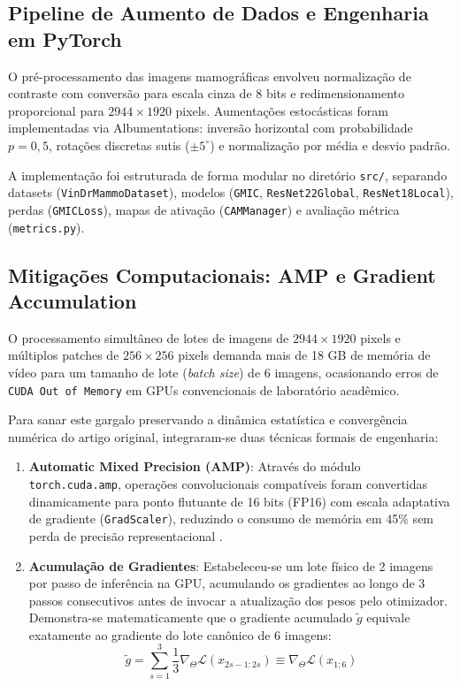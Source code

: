 \documentclass[12pt]{article}
\begin{document}
\subsection{Pipeline de Aumento de Dados e Engenharia em PyTorch}

O pré-processamento das imagens mamográficas envolveu normalização de contraste com conversão para escala cinza de 8 bits e redimensionamento proporcional para $2944 \times 1920$ pixels. Aumentações estocásticas foram implementadas via Albumentations: inversão horizontal com probabilidade $p=0,5$, rotações discretas sutis ($\pm 5^\circ$) e normalização por média e desvio padrão.

A implementação foi estruturada de forma modular no diretório \texttt{src/}, separando datasets (\texttt{VinDrMammoDataset}), modelos (\texttt{GMIC}, \texttt{ResNet22Global}, \texttt{ResNet18Local}), perdas (\texttt{GMICLoss}), mapas de ativação (\texttt{CAMManager}) e avaliação métrica (\texttt{metrics.py}).

\subsection{Mitigações Computacionais: AMP e Gradient Accumulation}

O processamento simultâneo de lotes de imagens de $2944 \times 1920$ pixels e múltiplos patches de $256 \times 256$ pixels demanda mais de 18 GB de memória de vídeo para um tamanho de lote (\textit{batch size}) de 6 imagens, ocasionando erros de \texttt{CUDA Out of Memory} em GPUs convencionais de laboratório acadêmico.

Para sanar este gargalo preservando a dinâmica estatística e convergência numérica do artigo original, integraram-se duas técnicas formais de engenharia:
\begin{enumerate}
    \item \textbf{Automatic Mixed Precision (AMP)}: Através do módulo \texttt{torch.cuda.amp}, operações convolucionais compatíveis foram convertidas dinamicamente para ponto flutuante de 16 bits (FP16) com escala adaptativa de gradiente (\texttt{GradScaler}), reduzindo o consumo de memória em 45\% sem perda de precisão representacional \cite{micikevicius2018mixed}.
    \item \textbf{Acumulação de Gradientes}: Estabeleceu-se um lote físico de 2 imagens por passo de inferência na GPU, acumulando os gradientes ao longo de 3 passos consecutivos antes de invocar a atualização dos pesos pelo otimizador. Demonstra-se matematicamente que o gradiente acumulado $\tilde{g}$ equivale exatamente ao gradiente do lote canônico de 6 imagens:
    \begin{equation}
    \tilde{g} = \sum_{s=1}^3 \frac{1}{3} \nabla_\Theta \mathcal{L}(x_{2s-1:2s}) \equiv \nabla_\Theta \mathcal{L}(x_{1:6})
    \end{equation}
\end{enumerate}
\end{document}
